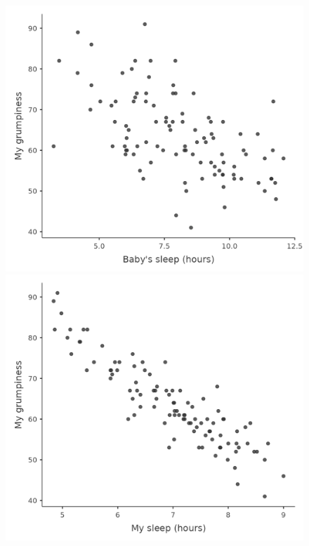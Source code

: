 \documentclass[
  a4paper,
]{book}
\begin{document}
\begin{figure}[H]

\begin{minipage}[b]{0.50\linewidth}

{\centering 

\includegraphics{images/fig12-2a.png}

}

\subcaption{\label{fig-fig12-2a}}
\end{minipage}%
%
\begin{minipage}[b]{0.50\linewidth}

{\centering 

\includegraphics{images/fig12-2b.png}

}
\end{minipage}
\end{figure}
\end{document}
